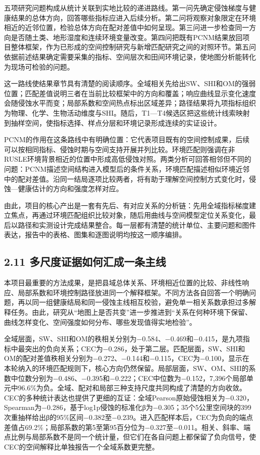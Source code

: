 \documentclass[
  11pt,
  a4paper,
]{ctexart}
\begin{document}
五项研究问题构成从统计关联到实地比较的递进路线。第一问先确定侵蚀梯度与健康结果的总体方向，回答哪些指标应进入后续分析。第二问将观察对象限定在环境相近的近邻位置，检验总体方向在配对差值中如何呈现。第三问进一步检查同一方向是否随土类、地形湿度和连续环境变量改变。第四问把既有PCNM结果放回项目整体框架，作为已形成的空间控制研究与新增匹配研究之间的对照环节。第五问依据前述结果确定需要采集的指标、空间层次和田间环境记录，使地图分析能转化为现场可检验的问题。

这一路线使结果章节具有清楚的阅读顺序。全域相关先给出SW、SHI和OM的强弱位置；匹配差值说明三者在当前比较框架中的方向和覆盖；响应曲线显示变化速度会随侵蚀水平而变；局部系数和空间热点标出区域差异；路径结果将九项指标组织为物理、化学、生物活动维度与SHI。随后，T1---T4候选区把这些统计线索映射到抽样空间，使指标选择、样点分层和环境记录形成连续的实证设计。

PCNM的作用在这条路线中有明确位置：它代表项目既有的空间控制成果，后续可以按相同指标、侵蚀时期与空间支持开展并列比较。环境匹配则强调在非RUSLE环境背景相近的位置中形成高低侵蚀对照。两类分析可回答相邻但不同的问题：PCNM描述空间结构进入模型后的条件关系，环境匹配描述相似环境近邻中的配对差值。沿同一结局逐项比较两者，将有助于理解空间控制方式变化时，侵蚀---健康估计的方向和强度怎样对应。

由此，项目的核心产出是一套有先后、有对应关系的分析链：先用全域指标梯度建立焦点，再通过环境匹配组织比较对象，随后用曲线与空间模型定位关系变化，最后以路径和实测设计完成结果整合。每一层都有清楚的统计单位、主要问题和图件表达，报告中的表格、图集和逐图说明均按这一顺序编排。

\hypertarget{ux591aux5c3aux5ea6ux8bc1ux636eux5982ux4f55ux6c47ux6210ux4e00ux6761ux4e3bux7ebf}{%
\subsection{2.11
多尺度证据如何汇成一条主线}\label{ux591aux5c3aux5ea6ux8bc1ux636eux5982ux4f55ux6c47ux6210ux4e00ux6761ux4e3bux7ebf}}

本项目最重要的方法成果，是把县域总体关系、环境相近位置的比较、非线性响应、局部系数和环境控制路径放进同一个解释框架。不同方法各自回答一个明确问题，再以同一组健康结局和同一侵蚀主线相互校验，避免单一相关系数承担过多解释任务。由此，研究从``地图上是否共变''进一步推进到``关系在何种环境下保留、曲线怎样变化、空间强度如何分布、哪些发现值得实地检验''。

全域层面，SW、SHI和OM的秩相关分别为−0.584、−0.469和−0.415，是九项指标中最突出的负向关系；CEC为−0.286，处于第二层。匹配层面，SW、SHI和OM的配对差值秩相关分别为−0.272、−0.144和−0.115，CEC为−0.100，显示在本轮纳入的环境匹配规则下，核心方向仍然保留。局部层面，SW、OM、SHI的系数中位数分别为−0.486、−0.395和−0.222；CEC中位数为−0.152，7,396个局部单元中96.6\%为负。全域、配对和局部三种支持尺度共同构成了清楚的方向收敛。CEC的多种统计表达也提供了更细的互证：全域Pearson原始侵蚀相关为−0.320，Spearman为−0.286，基于log1p侵蚀的标准化β为−0.305；35个5公里空间块的399次重抽样给出β的95\%区间−0.382至−0.239。进入匹配样本后，CEC为负向的端点差值占69.2\%；局部系数的第5至第95百分位为−0.327至−0.011。相关、斜率、端点比例与局部系数不是同一个统计量，但它们在各自问题上都保留了负向信号，使CEC的空间解释比单独报告一个全域系数更完整。
\end{document}
